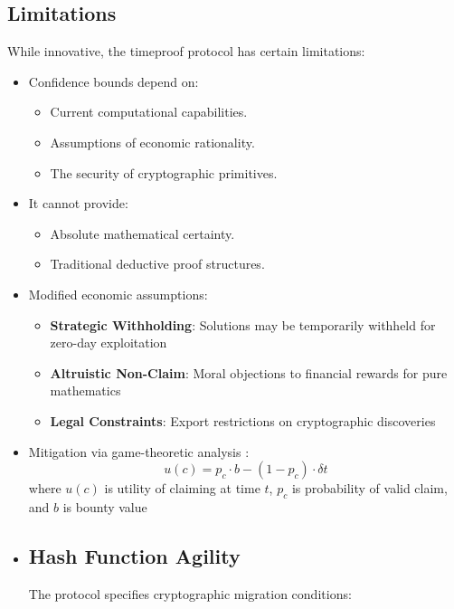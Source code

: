 \documentclass[12pt]{report}
\begin{document}
\subsection{Limitations}

While innovative, the timeproof protocol has certain limitations:

\begin{itemize}
    \item Confidence bounds depend on:
    \begin{itemize}
        \item Current computational capabilities.
        \item Assumptions of economic rationality.
        \item The security of cryptographic primitives.
    \end{itemize}
    \item It cannot provide:
    \begin{itemize}
        \item Absolute mathematical certainty.
        \item Traditional deductive proof structures.
    \end{itemize}
    \item Modified economic assumptions:
    \begin{itemize}
        \item \textbf{Strategic Withholding}: Solutions may be temporarily withheld for zero-day exploitation
        \item \textbf{Altruistic Non-Claim}: Moral objections to financial rewards for pure mathematics
        \item \textbf{Legal Constraints}: Export restrictions on cryptographic discoveries
    \end{itemize}
    \item Mitigation via game-theoretic analysis \cite{Roughgarden2016}:
    \begin{equation*}
        u(c) = p_c \cdot b - (1-p_c) \cdot \delta t
    \end{equation*}
    where $u(c)$ is utility of claiming at time $t$, $p_c$ is probability of valid claim, and $b$ is bounty value
    \item \subsection{Hash Function Agility}
    The protocol specifies cryptographic migration conditions:
    \begin{equation*}

\end{equation*}
\end{itemize}
\end{document}

